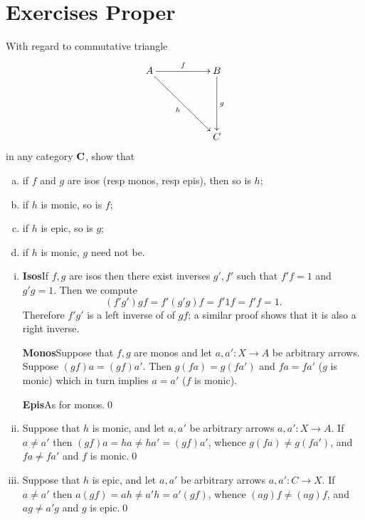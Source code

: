 \section{Exercises Proper}
\begin{bookproblem}
  With regard to commutative triangle
  \begin{equation}
    \xymatrix{ A \ar[rr]^f\ar[rrdd]_h && B\ar[dd]^g\\
    &&\\
    &&C
    }
  \end{equation}
  in any category \(\mathbf{{C}}\), show that
  \begin{enumerate}[(a)]
    \item if \(f\) and \(g\) are isos (resp monos, resp epis), then so is \(h\);
    \item if \(h\) is monic, so is \(f\);
    \item if \(h\) is epic, so is \(g\);
    \item if \(h\) is monic, \(g\) need not be.
  \end{enumerate}
      \begin{Solution}
        \begin{enumerate}[(i)]
          \item 
            \textbf{Isos}\quad If \(f,g\) are isos then there exist inverses \(g', f'\) such that \(f'f
            = 1\) and \(g'g = 1\). Then we compute 
            \begin{equation}(f'g')gf = f'(g'g)f = f'1f = f'f = 1.\end{equation}
            Therefore \(f'g'\) is a left inverse of of \(gf\); a similar proof shows
            that it is also a right inverse.

            \textbf{Monos}\quad Suppose that \(f,g\) are monos and let \(a, a': X
            \to A\) be arbitrary arrows. Suppose \((gf)a = (gf)a'\). Then \(g(fa) =
            g(fa')\) and \(fa = fa'\) (\(g\) is monic) which in turn implies \(a =
            a'\) (\(f\) is monic).

            \textbf{Epis}\quad As for monos.\qed{}
          \item 
            Suppose that \(h\) is monic, and let \(a, a'\) be arbitrary arrows
            \(a,a' : X \to A\). If \(a \not= a'\) then \((gf)a = ha \not= ha' =
            (gf)a'\), whence \(g(fa) \not= g(fa')\), and \(fa \not= fa'\) and \(f\)
            is monic.\qed{}
          \item 
            Suppose that \(h\) is epic, and let \(a, a'\) be arbitrary arrows
            \(a,a' : C \to X\). If \(a \not= a'\) then \(a(gf) = ah \not= a'h =
            a'(gf)\), whence \((ag)f \not= (ag)f\), and \(ag \not= a'g\) and \(g\)
            is epic.\qed{}


\end{enumerate}
\end{Solution}
\end{bookproblem}
